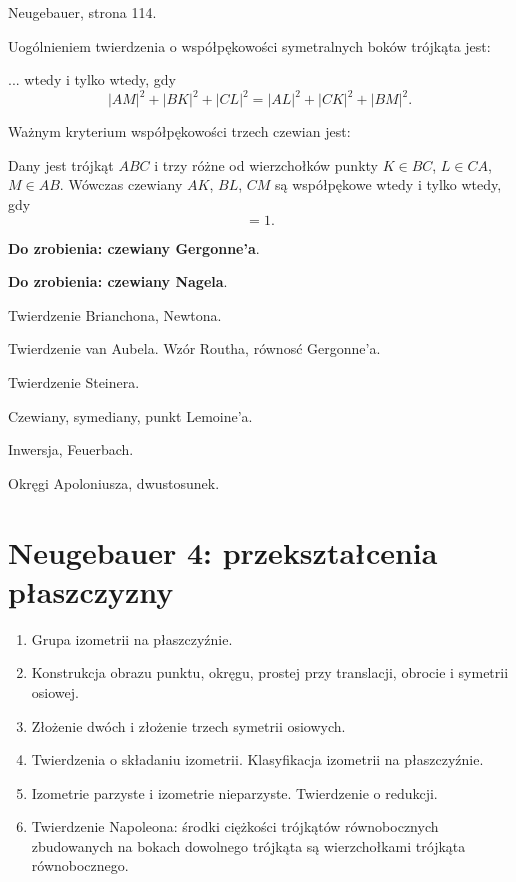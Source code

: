 \documentclass{parchment}
\begin{document}
\begin{proposition}
	Neugebauer, strona 114.
\end{proposition}



Uogólnieniem twierdzenia o współpękowości symetralnych boków trójkąta jest:

\begin{proposition}
	... wtedy i tylko wtedy, gdy
	\begin{equation}
		|AM|^2 + |BK|^2 + |CL|^2 = |AL|^2 + |CK|^2 + |BM|^2.
	\end{equation}
\end{proposition}

Ważnym kryterium współpękowości trzech czewian jest:

\begin{proposition}
	Dany jest trójkąt $ABC$ i trzy różne od wierzchołków punkty $K \in BC$, $L \in CA$, $M \in AB$.
	Wówczas czewiany $AK$, $BL$, $CM$ są współpękowe wtedy i tylko wtedy, gdy
	\begin{equation}
		[AMB] [BKC] [CLA] = 1.
	\end{equation}
\end{proposition}

\textbf{Do zrobienia: czewiany Gergonne'a}.

\textbf{Do zrobienia: czewiany Nagela}.

Twierdzenie Brianchona, Newtona.

Twierdzenie van Aubela.
Wzór Routha, równosć Gergonne'a.

Twierdzenie Steinera.

Czewiany, symediany, punkt Lemoine'a.

Inwersja, Feuerbach.

Okręgi Apoloniusza, dwustosunek.

\chapter{Neugebauer 4: przekształcenia płaszczyzny}
\begin{enumerate}
	\item Grupa izometrii na płaszczyźnie.
	\item Konstrukcja obrazu punktu, okręgu, prostej przy translacji, obrocie i symetrii osiowej.
	\item Złożenie dwóch i złożenie trzech symetrii osiowych. 
	\item Twierdzenia o składaniu izometrii. Klasyfikacja izometrii na płaszczyźnie. 
	\item Izometrie parzyste i izometrie nieparzyste. Twierdzenie o redukcji.
	\item Twierdzenie Napoleona: środki ciężkości trójkątów równobocznych zbudowanych na bokach dowolnego trójkąta są wierzchołkami trójkąta równobocznego.
\end{enumerate}
\end{document}
